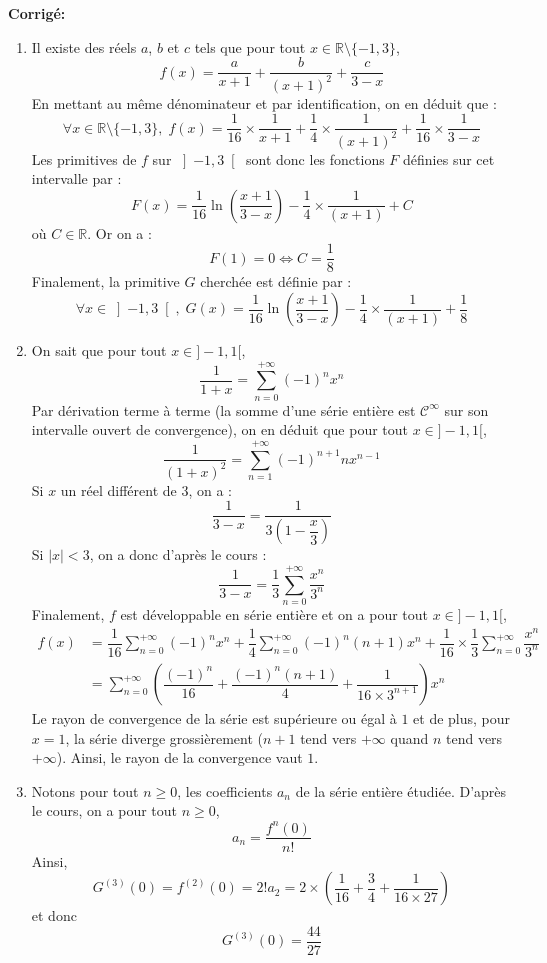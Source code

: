 \documentclass[a4paper,twoside,french,11pt]{VcCours}
\newcommand{\corr}{\textbf{Corrigé:}}
\begin{document}
\corr \begin{enumerate}
\item Il existe des réels $a$, $b$ et $c$ tels que pour tout $x \in \mathbb{R} \setminus \lbrace -1,3 \rbrace$,
$$ f(x) = \dfrac{a}{x+1} + \dfrac{b}{(x+1)^2} +  \dfrac{c}{3-x}$$
En mettant au même dénominateur et par identification, on en déduit que :
$$ \forall x \in \mathbb{R} \setminus \lbrace -1,3 \rbrace , \; f(x)=\dfrac{1}{16}\times\dfrac{1}{x+1}+\dfrac{1}{4}\times\dfrac{1}{(x+1)^2}+\dfrac{1}{16}\times\dfrac{1}{3-x}$$
Les primitives de $f$ sur $\left]-1,3\right[$ sont donc les fonctions $F$ définies sur cet intervalle par :
$$F(x)=\dfrac{1}{16}\ln \left( \dfrac{x+1}{3-x}\right) -\dfrac{1}{4}\times\dfrac{1}{(x+1)}+C$$
où $C\in\mathbb{R}$. Or on a :
$$F(1)=0\Longleftrightarrow C=\dfrac{1}{8}$$
Finalement, la primitive $G$ cherchée est définie par :
$$ \forall x\in \left]-1,3 \right[ , \; G(x)= \dfrac{1}{16}\ln \left( \dfrac{x+1}{3-x}\right) -\dfrac{1}{4}\times\dfrac{1}{(x+1)}+\dfrac{1}{8}$$
\item On sait que pour tout $x \in ]-1,1[$,
$$\dfrac{1}{1+x}=\sum\limits_{n=0}^{+\infty}(-1)^{n}x^n$$
Par dérivation terme à terme (la somme d'une série entière est $\mathcal{C}^{\infty}$ sur son intervalle ouvert de convergence), on en déduit que pour tout $x \in ]-1,1[$,
$$\dfrac{1}{(1+x)^2}=\sum\limits_{n=1}^{+\infty}(-1)^{n+1}nx^{n-1}$$
Si $x$ un réel différent de $3$, on a :
$$\dfrac{1}{3-x}=\dfrac{1} {3\left( 1-\dfrac{x}{3}\right) }$$
Si $\vert x \vert <3$, on a donc d'après le cours :
$$\dfrac{1}{3-x}=\dfrac{1}{3}\sum\limits_{n=0}^{+\infty}\dfrac{x^n}{3^n}$$
Finalement, $f$ est développable en série entière et on a pour tout $x \in ]-1,1[$,
\begin{align*}
f(x)
&= \dfrac{1}{16} \sum\limits_{n=0}^{+\infty}(-1)^{n}x^n
+\dfrac{1}{4}\sum\limits_{n=0}^{+\infty}(-1)^{n}(n+1)x^{n}
+\dfrac{1}{16}\times \dfrac{1}{3}\sum\limits_{n=0}^{+\infty}\dfrac{x^n}{3^n}\\
&= \sum\limits_{n=0}^{+\infty}\left(\dfrac{(-1)^n}{16}
+\dfrac{(-1)^n(n+1)}{4}+\dfrac{1}{16\times3^{n+1}} \right) x^n
\end{align*}
Le rayon de convergence de la série est supérieure ou égal à $1$ et de plus, pour $x=1$, la série diverge grossièrement ($n+1$ tend vers $+ \infty$ quand $n$ tend vers $+ \infty$). Ainsi, le rayon de la convergence vaut $1$.
\item Notons pour tout $n \geq 0$, les coefficients $a_n$ de la série entière étudiée.  D'après le cours, on a pour tout $n \geq 0$,
$$ a_n = \dfrac{f^n(0)}{n!}$$
Ainsi,
$$G^{(3)}(0)=f^{(2)}(0)=2!a_2=2\times\left(\dfrac{1}{16} +\dfrac{3}{4}+\dfrac{1}{16\times 27}\right)$$
et donc
$$ G^{(3)}(0)=\dfrac{44}{27}$$
\end{enumerate}
\end{document}
